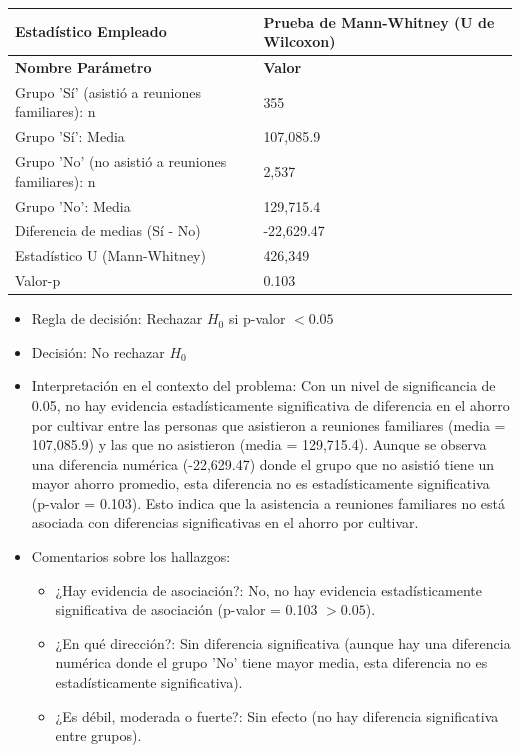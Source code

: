 \documentclass[12pt,a4paper]{article}
\begin{document}
\begin{tabular}{|m{7cm}|m{7cm}|}
\hline
\textbf{Estadístico Empleado} & Prueba de Mann-Whitney (U de Wilcoxon) \\ \hline
\textbf{Nombre Parámetro} & \textbf{Valor} \\ \hline
Grupo 'Sí' (asistió a reuniones familiares): n & 355 \\ \hline
Grupo 'Sí': Media & 107,085.9 \\ \hline
Grupo 'No' (no asistió a reuniones familiares): n & 2,537 \\ \hline
Grupo 'No': Media & 129,715.4 \\ \hline
Diferencia de medias (Sí - No) & -22,629.47 \\ \hline
Estadístico U (Mann-Whitney) & 426,349 \\ \hline
Valor-p & 0.103 \\ \hline
\end{tabular}

\begin{itemize}
    \item Regla de decisión: Rechazar $H_0$ si p-valor $< 0.05$
    \item Decisión: No rechazar $H_0$
    \item Interpretación en el contexto del problema: Con un nivel de significancia de 0.05, no hay evidencia estadísticamente significativa de diferencia en el ahorro por cultivar entre las personas que asistieron a reuniones familiares (media = 107,085.9) y las que no asistieron (media = 129,715.4). Aunque se observa una diferencia numérica (-22,629.47) donde el grupo que no asistió tiene un mayor ahorro promedio, esta diferencia no es estadísticamente significativa (p-valor = 0.103). Esto indica que la asistencia a reuniones familiares no está asociada con diferencias significativas en el ahorro por cultivar.
    \item Comentarios sobre los hallazgos:
    \begin{itemize}
        \item ¿Hay evidencia de asociación?: No, no hay evidencia estadísticamente significativa de asociación (p-valor = 0.103 $> 0.05$).
        \item ¿En qué dirección?: Sin diferencia significativa (aunque hay una diferencia numérica donde el grupo 'No' tiene mayor media, esta diferencia no es estadísticamente significativa).
        \item ¿Es débil, moderada o fuerte?: Sin efecto (no hay diferencia significativa entre grupos).
    \end{itemize}
\end{itemize}
\end{document}
